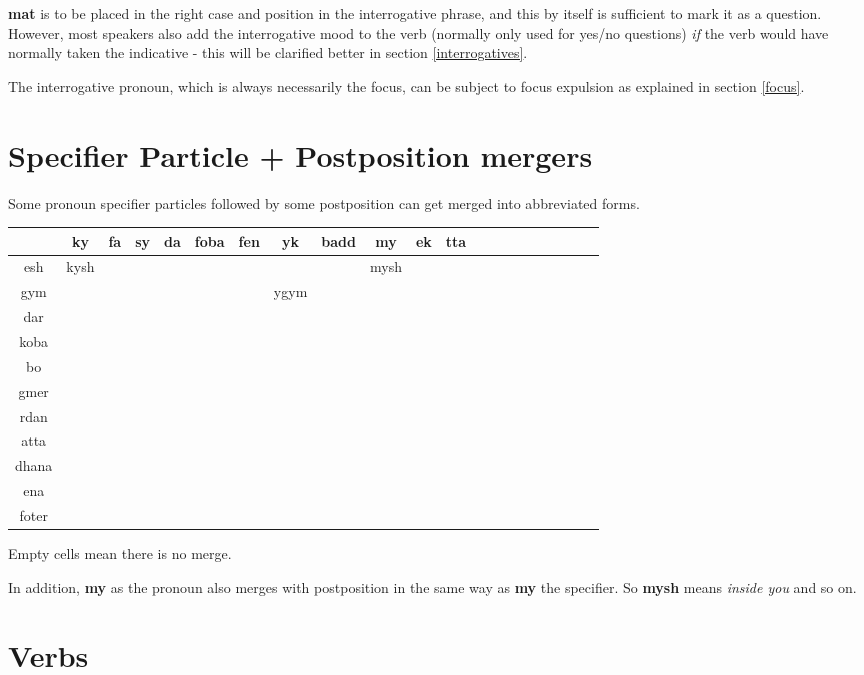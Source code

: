 \documentclass[10pt,oneside]{memoir}
\begin{document}
\textbf{mat} is to be placed in the right case and position in the interrogative phrase, and this by itself is sufficient to mark it as a question. However, most speakers also add the interrogative mood to the verb (normally only used for yes/no questions) \emph{if} the verb would have normally taken the indicative - this will be clarified better in section \ref{interrogatives}.

The interrogative pronoun, which is always necessarily the focus, can be subject to focus expulsion as explained in section \ref{focus}.

\pagebreak

\section{Specifier Particle + Postposition mergers}\label{mergers}

Some pronoun specifier particles followed by some postposition can get merged into abbreviated forms.

\begin{center}
\begin{tabular}[]{c|*{20}{|c}|}
    & ky & fa & sy & da & foba & fen & yk & badd & my   & ek & tta \\\hline\hline
esh & kysh &  &    &    &      &     &    &      & mysh &    &     \\\hline
gym &    &    &    &    &      &     &ygym&      &      &    &     \\\hline
dar \\\hline
koba\\\hline
bo\\\hline
gmer\\\hline
rdan\\\hline
atta\\\hline
dhana\\\hline
ena\\
foter\\\hline
\end{tabular}
\end{center}

Empty cells mean there is no merge.

In addition, \textbf{my} as the pronoun also merges with postposition in the same way as \textbf{my} the specifier. So \textbf{mysh} means \emph{inside you} and so on.

\pagebreak

\section{Verbs}\label{verbs}
\end{document}
